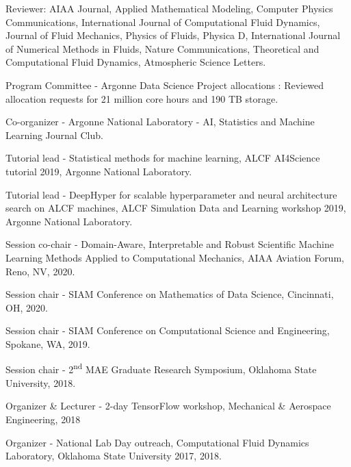 \documentclass[letterpaper]{article}
\renewenvironment{itemize}{
  \begin{list}{}{
    \setlength{\leftmargin}{1.5em}
  }
}{
  \end{list}
}
\begin{document}
\begin{itemize}
    \item Reviewer: AIAA Journal, Applied Mathematical Modeling, Computer Physics Communications, International Journal of Computational Fluid Dynamics, Journal of Fluid Mechanics, Physics of Fluids, Physica D, International Journal of Numerical Methods in Fluids, Nature Communications, Theoretical and Computational Fluid Dynamics, Atmospheric Science Letters.
    \item Program Committee - Argonne Data Science Project allocations : Reviewed allocation requests for 21 million core hours and 190 TB storage.
    \item Co-organizer - Argonne National Laboratory - AI, Statistics and Machine Learning Journal Club.
    \item Tutorial lead - Statistical methods for machine learning, ALCF AI4Science tutorial 2019, Argonne National Laboratory.
    \item Tutorial lead - DeepHyper for scalable hyperparameter and neural architecture search on ALCF machines, ALCF Simulation Data and Learning workshop 2019, Argonne National Laboratory.
    \item Session co-chair - Domain-Aware, Interpretable and Robust Scientific Machine Learning Methods Applied to Computational Mechanics, AIAA Aviation Forum, Reno, NV, 2020.
    \item Session chair - SIAM Conference on Mathematics of Data Science, Cincinnati, OH, 2020.
    \item Session chair - SIAM Conference on Computational Science and Engineering, Spokane, WA, 2019.
    \item Session chair - 2\textsuperscript{nd} MAE Graduate Research Symposium, Oklahoma State University, 2018.
    \item Organizer \& Lecturer - 2-day TensorFlow workshop, Mechanical \& Aerospace Engineering, 2018
    \item Organizer - National Lab Day outreach, Computational Fluid Dynamics Laboratory, Oklahoma State University 2017, 2018.
\end{itemize}

\bigskip

\end{document}
